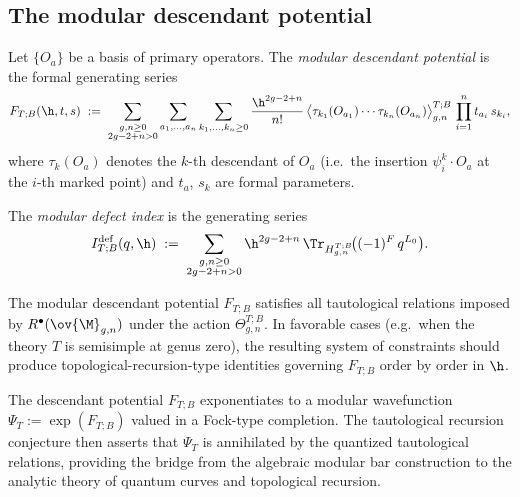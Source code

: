 \subsection{The modular descendant potential}
\label{subsec:modular-descendant-potential}

\begin{definition}
\label{def:modular-descendant-potential}
Let $\{O_a\}$ be a basis of primary operators.  The \emph{modular descendant potential}
is the formal generating series
\begin{equation}
\label{eq:modular-descendant-potential}
F_{T;B}(\h,t,s)
\;:=\;
\sum_{\substack{g,n \geq 0 \\ 2g-2+n > 0}}
\sum_{a_1,\dots,a_n}
\sum_{k_1,\dots,k_n \geq 0}
\frac{\h^{2g-2+n}}{n!}\,
\bigl\langle \tau_{k_1}(O_{a_1}) \cdots \tau_{k_n}(O_{a_n})
\bigr\rangle_{g,n}^{T;B}\,
\prod_{i=1}^n t_{a_i}\,s_{k_i},
\end{equation}
where $\tau_k(O_a)$ denotes the $k$-th descendant of $O_a$ (i.e.\ the insertion
$\psi_i^k \cdot O_a$ at the $i$-th marked point) and $t_a$, $s_k$ are formal parameters.
\end{definition}

\begin{definition}
\label{def:modular-defect-index}
The \emph{modular defect index} is the generating series
\begin{equation}
\label{eq:modular-defect-index}
I_{T;B}^{\mathrm{def}}(q,\h)
\;:=\;
\sum_{\substack{g,n \geq 0 \\ 2g-2+n > 0}}
\h^{2g-2+n}\,
\Tr_{H_{g,n}^{T;B}}\!\bigl((-1)^F\,q^{L_0}\bigr).
\end{equation}
\end{definition}

\begin{conjecture}
\label{conj:tautological-recursion}
The modular descendant potential $F_{T;B}$ satisfies all tautological relations imposed by
$R^\bullet(\ov{\M}_{g,n})$ under the action $\Theta_{g,n}^{T;B}$.  In favorable cases
(e.g.\ when the theory $T$ is semisimple at genus zero), the resulting system of
constraints should produce topological-recursion-type identities governing $F_{T;B}$
order by order in $\h$.
\end{conjecture}

\begin{remark}
\label{rem:descendant-wavefunction}
The descendant potential $F_{T;B}$ exponentiates to a modular wavefunction
$\Psi_T := \exp(F_{T;B})$ valued in a Fock-type completion.  The tautological recursion
conjecture then asserts that $\Psi_T$ is annihilated by the quantized tautological
relations, providing the bridge from the algebraic modular bar construction to the
analytic theory of quantum curves and topological recursion.
\end{remark}

